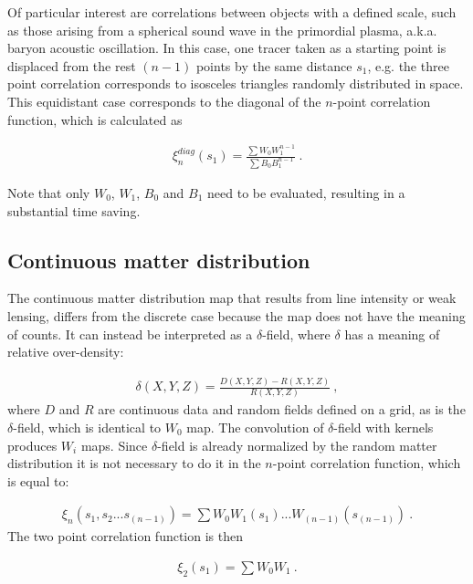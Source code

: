 \documentclass{aa}
\begin{document}
Of particular interest are correlations between objects with a defined scale, such as those  arising from a spherical sound wave in the primordial plasma, a.k.a. baryon acoustic oscillation. In this case, one tracer taken as a starting point is displaced from the rest $(n-1)$ points  by the same distance $s_1$, e.g. the three point correlation  corresponds to isosceles triangles randomly distributed in space. This equidistant case corresponds to the diagonal of the $n$-point correlation function, which is calculated as 

\begin{align}
\xi_n^{diag}(s_1) =\frac{\sum W_0  W_1^{n-1}} {\sum B_0  B_1^{n-1}}\ . 
\label{eq:ksinDiag}
\end{align} 

Note that only $W_0$, $W_1$, $B_0$ and $B_1$ need to be evaluated, resulting in a substantial time saving. 

\subsection{Continuous matter distribution} 

The continuous matter distribution map that results from line intensity or weak lensing, differs from the discrete case because the map does not have the meaning of counts. It can instead be interpreted as a $\delta$-field, where $\delta$ has a meaning of relative over-density:

\begin{align}
\delta(X,Y,Z) = \frac{D(X,Y,Z) - R(X,Y,Z)}{R(X,Y,Z)} \ , 
\label{eq:densitycont}
\end{align}
%
where $D$ and $R$ are continuous data and random fields defined on a grid, as is the $\delta$-field, which is identical to $W_0$ map. The convolution of $\delta$-field with kernels  produces $W_i$ maps. 
Since  $\delta$-field is already  normalized by the random matter distribution it is not necessary to do it in the $n$-point correlation function, which is equal to:

\begin{align}
\xi_n(s_1, s_2...s_{(n-1)}) =\sum W_0  W_1(s_1)... W_{(n-1)}(s_{(n-1)}) \ . 
 \label{eq:ksin_cont}
\end{align}
%
The two point correlation function is then

\begin{align}
\xi_2(s_1) = \sum W_0  W_1  \ . 
\label{eq:ksi2_cont}
\end{align} 
\end{document}

